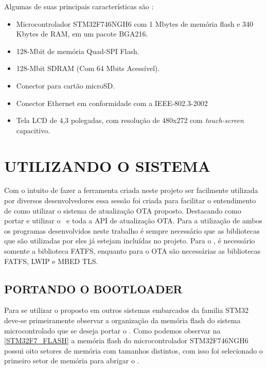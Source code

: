 Algumas de suas principais características são \cite{STM32F7}:
\begin{itemize}
    \item Microcontrolador STM32F746NGH6 com 1 Mbytes de memória flash e 340 Kbytes de RAM, em um pacote BGA216.
    \item 128-Mbit de memória Quad-SPI Flash.
    \item 128-Mbit SDRAM (Com 64 Mbits Acessível).
    \item Conector para cartão microSD.
    \item Conector Ethernet em conformidade com a IEEE-802.3-2002
    \item Tela LCD de 4,3 polegadas, com resolução de 480x272 com \textit{touch-screen} capacitivo.
    
\end{itemize}
\section{UTILIZANDO O SISTEMA}
Com o intuito de fazer a ferramenta criada neste projeto ser facilmente utilizada por diversos desenvolvedores essa sessão foi criada para facilitar o entendimento de como utilizar o sistema de atualização OTA proposto. Destacando como portar e utilizar o \bootloader\ e toda a API de atualização OTA. Para a utilização de ambos os programas desenvolvidos neste trabalho é sempre necessário que as bibliotecas que são utilizadas por eles já estejam incluídas no projeto. Para o \bootloader, é necessário somente a biblioteca FATFS, enquanto para o OTA são necessárias as bibliotecas FATFS, LWIP e MBED TLS.

\subsection{PORTANDO O BOOTLOADER}
Para se utilizar o \bootloader proposto em outros sistemas embarcados da familia STM32 deve-se primeiramente observar a organização da memória flash do sistema microcontrolado que se deseja portar o \bootloader. Como podemos observar na \autoref{STM32F7_FLASH} a memória flash do microcontrolador STM32F746NGH6 possui oito setores de memória com tamanhos distintos, com isso foi selecionado o primeiro setor de memória para abrigar o \bootloader.

